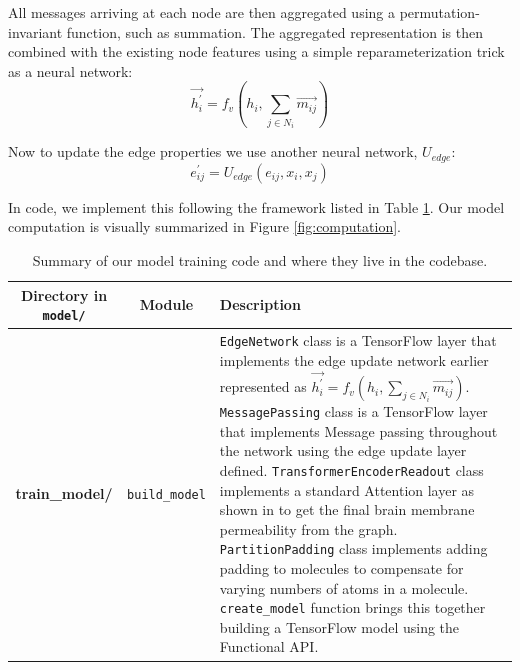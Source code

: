 \documentclass[fontsize=11pt]{article}
\begin{document}
All messages arriving at each node are then aggregated using a permutation-invariant function, such as summation. The aggregated representation is then combined with the existing node features using a simple reparameterization trick as a neural network:
\begin{equation*}
    \vec{h_i^{\prime}} = f_v(h_i, \sum_{j \in N_i} \vec{m_{ij}})
\end{equation*}

Now to update the edge properties we use another neural network, $U_{edge}$:
\begin{equation*}
    e_{ij}^{\prime} = U_{edge}(e_{ij}, x_i, x_j)
\end{equation*}

In code, we implement this following the framework listed in Table \ref{tab:model}. Our model computation is visually summarized in Figure \ref{fig:computation}.

\begin{table}[ht]
\centering
\caption{Summary of our model training code and where they live in the codebase.}
\label{tab:model}
\begin{tabularx}{\textwidth}{ccX}
\toprule
\textbf{Directory in \texttt{model/}} & \textbf{Module} & \textbf{Description}\\
\midrule
\multirow{10}{*}{\textbf{train\_model/}} & \texttt{build\_model} &\texttt{EdgeNetwork} class is a TensorFlow layer that implements the edge update network earlier represented as $ \vec{h_i^{\prime}} = f_v(h_i, \sum_{j \in N_i} \vec{m_{ij}})$. \texttt{MessagePassing} class is a TensorFlow layer that implements Message passing throughout the network using the edge update layer defined. \texttt{TransformerEncoderReadout} class implements a standard Attention layer as shown in \cite{vaswani2017attention} to get the final brain membrane permeability from the graph. \texttt{PartitionPadding} class implements adding padding to molecules to compensate for varying numbers of atoms in a molecule. \texttt{create\_model} function brings this together building a TensorFlow model using the Functional API.\\
\bottomrule
\end{tabularx}
\end{table}
\end{document}
